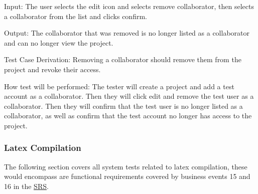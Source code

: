 \documentclass[12pt, titlepage]{article}
\begin{document}
\begin{enumerate}
		Input: The user selects the edit icon and selects remove collaborator, then selects a collaborator from the list and clicks confirm. 
		
		Output: The collaborator that was removed is no longer listed as a collaborator and can no longer view the project.
		
		Test Case Derivation: Removing a collaborator should remove them from the project and revoke their access.
		
		How test will be performed: The tester will create a project and add a test account as a collaborator. Then they will click edit and remove the test user as a collaborator. Then they will confirm that the test user is no longer listed as a collaborator, as well as confirm that the test account no longer has access to the project.
		
		
	\end{enumerate}
	
	\subsubsection{Latex Compilation}
	
	The following section covers all system tests related to latex compilation, these would encompass are functional requirements covered by business events 15 and 16 in the \href{https://github.com/RutheniumVI/UnderTree/blob/main/docs/SRS/SRS.pdf}{SRS}.
	
\end{document}
